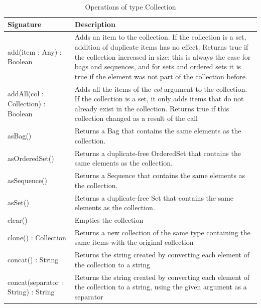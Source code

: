 \begin{longtabu} {|p{6.5cm}|X|}
\caption{Operations of type Collection}
\label{tab:Collection Operations}\\
\hline
    \textbf{Signature} & \textbf{Description} \\\hline
    add(item : Any) : Boolean & Adds an item to the collection. If the collection is a set, addition of duplicate items has no effect. Returns true if the collection increased in size: this is always the case for bags and sequences, and for sets and ordered sets it is true if the element was not part of the collection before. \\\hline
    
    addAll(col : Collection) : Boolean & Adds all the items of the \emph{col} argument to the collection. If the collection is a set, it only adds items that do not already exist in the collection. Returns true if this collection changed as a result of the call\\\hline
    
    asBag() & Returns a Bag that contains the same elements as the collection. \\\hline
    
    asOrderedSet() & Returns a duplicate-free OrderedSet that contains the same elements as the collection. \\\hline
    
    asSequence() & Returns a Sequence that contains the same elements as the collection. \\\hline
    
    asSet() & Returns a duplicate-free Set that contains the same elements as the collection. \\\hline
    
    clear() & Empties the collection \\\hline
    
    clone() : Collection & Returns a new collection of the same type containing the same items with the original collection \\\hline
    
    concat() : String & Returns the string created by converting each element of the collection to a string \\\hline
    
    concat(separator : String) : String & Returns the string created by converting each element of the collection to a string, using the given argument as a separator \\\hline
    

\end{longtabu}
